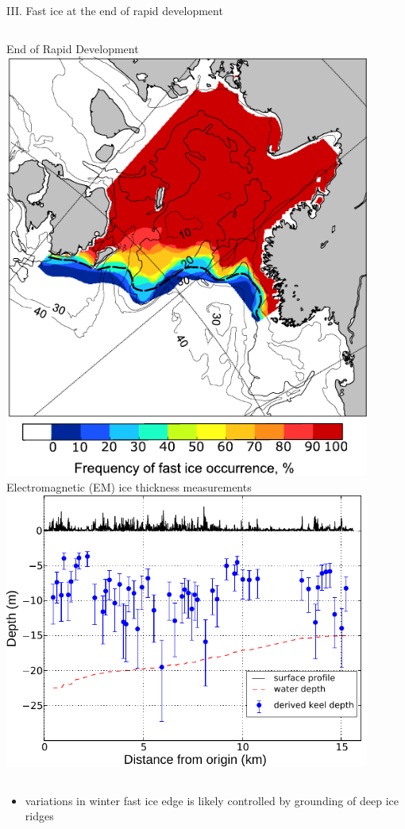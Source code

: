 \documentclass[8pt]{beamer}
\begin{document}
\setwatermark{\fontsize{125pt}{125pt}\selectfont{}}
\begin{frame}[fragile]{III. Fast ice at the end of rapid development}
\begin{columns}
	End of Rapid Development
		\includegraphics[width=0.9\textwidth]{./img/Rgrth_freqency.pdf}
	Electromagnetic (EM) ice thickness measurements
		\includegraphics[width=0.9\textwidth]{./img/EM_profile.pdf}
	\end{columns}
\begin{itemize}
	\item variations in winter fast ice edge is likely controlled by grounding of deep ice ridges
\end{itemize}
\end{frame}
\end{document}
